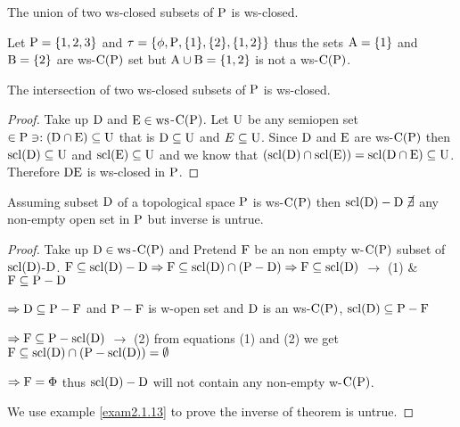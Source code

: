 \begin{thm}\label{thm2.1.5}
The union of two ws-closed subsets of $\mathrm{P}$ is ws-closed.
\end{thm}

\begin{exm}\label{exm2.1.12}
Let $\mathrm{P} = \{1, 2, 3\}$ and $\tau = \{\phi, \mathrm{P}, \{1\}, \{2\}, \{1, 2\}\}$ thus the sets $\mathrm{A}= \{1\}$ and $\mathrm{B}= \{2\}$ are ws-$\mathrm{C}(\mathrm{P})$ set but $\mathrm{A}\cup \mathrm{B} = \{1,2 \}$ is not a ws-$\mathrm{C}(\mathrm{P})$.
\end{exm}

\begin{thm}\label{thm2.1.6}
The intersection of two ws-closed subsets of $\mathrm{P}$ is ws-closed.
\end{thm}

\begin{proof}
Take up $\mathrm{D}$ and $\mathrm{E}\in \mathrm{ws}$-$\mathrm{C}(\mathrm{P})$. Let $\mathrm{U}$ be any semiopen set $\in\mathrm{P} \ni: (\mathrm{D}\cap \mathrm{E})\subseteq \mathrm{U}$ that is $\mathrm{D}\subseteq \mathrm{U}$ and $E\subseteq \mathrm{U}$. Since $\mathrm{D}$ and $\mathrm{E}$ are ws-$\mathrm{C}(\mathrm{P})$ then $\mathrm{scl}(\mathrm{D}) \subseteq  \mathrm{U}$ and $\mathrm{scl}(\mathrm{E})\subseteq \mathrm{U}$ and we know that $(\mathrm{scl}(\mathrm{D})\cap \mathrm{scl}(\mathrm{E})) = \mathrm{scl}(\mathrm{D}\cap \mathrm{E})\subseteq \mathrm{U}$. Therefore $\mathrm{D}\mathrm{E}$ is ws-closed in $\mathrm{P}$.
\end{proof}

\begin{thm}\label{thm2.1.7}
Assuming subset $\mathrm{D}$ of a topological space $\mathrm{P}$ is ws-$\mathrm{C}(\mathrm{P})$ then $\mathrm{scl}(\mathrm{D})-\mathrm{D}~\cancel{\exists}$ any non-empty open set in $\mathrm{P}$ but inverse is untrue.
\end{thm}

\begin{proof}
Take up $\mathrm{D}\in\mathrm{ws}$-$\mathrm{C}(\mathrm{P})$ and Pretend $\mathrm{F}$ be an non empty w-$\mathrm{C}(\mathrm{P})$ subset of $\mathrm{scl}(\mathrm{D})$-$\mathrm{D}$. $\mathrm{F}\subseteq \mathrm{scl}(\mathrm{D})-\mathrm{D}\Rightarrow\mathrm{F}\subseteq \mathrm{scl}(\mathrm{D})\cap(\mathrm{P}-\mathrm{D})\Rightarrow \mathrm{F}\subseteq \mathrm{scl}(\mathrm{D})$ $\to$ (1) \& $\mathrm{F}\subseteq\mathrm{P}-\mathrm{D}$

$\Rightarrow \mathrm{D}\subseteq \mathrm{P}-\mathrm{F}$ and $\mathrm{P}-\mathrm{F}$ is w-open set and $\mathrm{D}$ is an ws-$\mathrm{C}(\mathrm{P})$, $\mathrm{scl}(\mathrm{D})\subseteq \mathrm{P}-\mathrm{F}$

$\Rightarrow \mathrm{F}\subseteq \mathrm{P}-\mathrm{scl}(\mathrm{D})$ $\to$ (2) from equations (1) and (2) we get $\mathrm{F}\subseteq \mathrm{scl}(\mathrm{D})\cap(\mathrm{P}-\mathrm{scl}(\mathrm{D}))=\emptyset$

$\Rightarrow\mathrm{F} =\Phi$ thus $\mathrm{scl}(\mathrm{D})-\mathrm{D}$ will not contain any non-empty w-$\mathrm{C}(\mathrm{P})$.

We use example \ref{exam2.1.13} to prove the inverse of theorem is untrue.
\end{proof}

